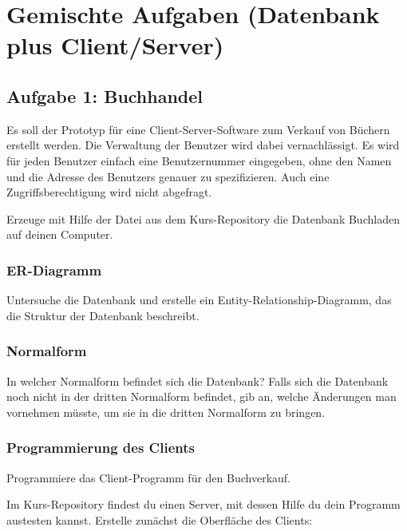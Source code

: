 \section{Gemischte Aufgaben (Datenbank plus Client/Server)}

\subsection{Aufgabe 1: Buchhandel}

Es soll der Prototyp für eine Client-Server-Software zum Verkauf von Büchern
erstellt werden. Die Verwaltung der Benutzer wird dabei vernachlässigt. Es wird
für jeden Benutzer einfach eine Benutzernummer eingegeben, ohne den Namen und
die Adresse des Benutzers genauer zu spezifizieren. Auch eine
Zugriffsberechtigung wird nicht abgefragt.

Erzeuge mit Hilfe der Datei  aus dem Kurs-Repository die
Datenbank Buchladen auf deinen Computer.

\subsubsection{ER-Diagramm}

Untersuche die Datenbank und erstelle ein Entity-Relationship-Diagramm, das die
Struktur der Datenbank beschreibt.

\subsubsection{Normalform}

In welcher Normalform befindet sich die Datenbank? Falls sich die Datenbank
noch nicht in der dritten Normalform befindet, gib an, welche Änderungen man
vornehmen müsste, um sie in die dritten Normalform zu bringen.

\subsubsection{Programmierung des Clients}

Programmiere das Client-Programm für den Buchverkauf. 

Im Kurs-Repository findest du einen Server, mit dessen Hilfe du dein Programm
austesten kannst. Erstelle zunächst die Oberfläche des Clients:

